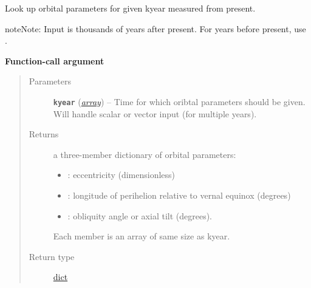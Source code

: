 \documentclass[a4paper,10pt,english]{sphinxmanual}
\begin{document}
\begin{fulllineitems}
\begin{quote}
\begin{description}
\begin{itemize}
\end{itemize}

\end{description}\end{quote}

\begin{fulllineitems}
\label{api/climlab.solar:climlab.solar.orbital.OrbitalTable.lookup_parameters}
Look up orbital parameters for given kyear measured from present.

\begin{notice}{note}{Note:}
Input  is thousands of years after present.
For years before present, use .
\end{notice}

\textbf{Function-call argument}
\begin{quote}\begin{description}
\item[{Parameters}] \leavevmode
\textbf{\texttt{kyear}} (\href{http://docs.python.org/2.7/library/array.html\#module-array}{\emph{array}}) -- Time for which oribtal parameters should be given.     
Will handle scalar or vector input (for multiple years).

\item[{Returns}] \leavevmode

a three-member dictionary of orbital parameters:
\begin{itemize}
\item {} 
: eccentricity (dimensionless)

\item {} 
: longitude of perihelion 
relative to vernal equinox (degrees)

\item {} 
: obliquity angle or axial tilt (degrees).

\end{itemize}

Each member is an array of same size as kyear.


\item[{Return type}] \leavevmode
\href{http://docs.python.org/2.7/library/stdtypes.html\#dict}{dict}

\end{description}\end{quote}

\end{fulllineitems}


\end{fulllineitems}
\end{document}

